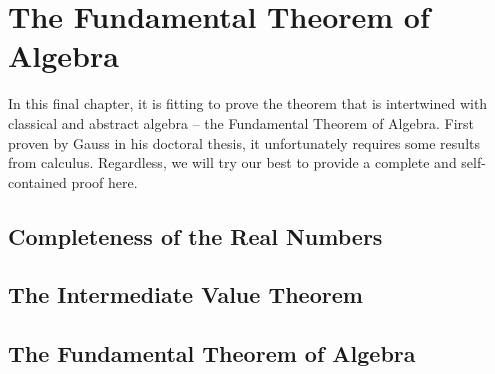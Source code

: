 \chapter{The Fundamental Theorem of Algebra}
In this final chapter, it is fitting to prove the theorem that is intertwined with classical and abstract algebra -- the Fundamental Theorem of Algebra. First proven by Gauss in his doctoral thesis, it unfortunately requires some results from calculus. Regardless, we will try our best to provide a complete and self-contained proof here.

\section{Completeness of the Real Numbers}

\section{The Intermediate Value Theorem}

\section{The Fundamental Theorem of Algebra}

